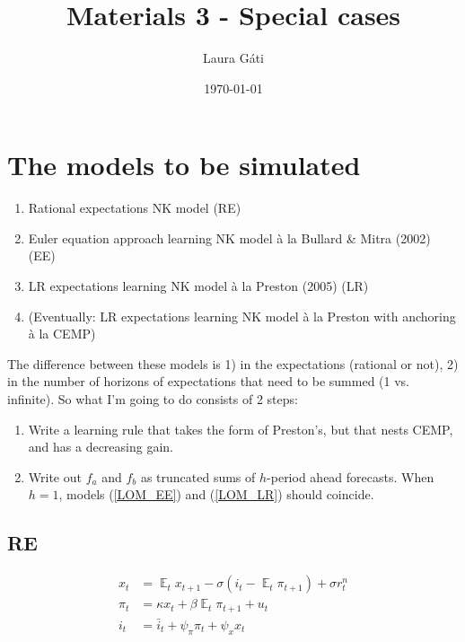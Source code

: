 \documentclass[11pt]{article}
\renewcommand{\[}{\begin{equation}}
\renewcommand{\]}{\end{equation}}
\DeclareMathOperator{\E}{\mathbb{E}}
\begin{document}
\linespread{1.0}

\title{Materials 3 - Special cases}
\author{Laura G\'ati} 
\date{\today}
\maketitle


\tableofcontents


\newpage
\section{The models to be simulated}
\begin{enumerate}
\item Rational expectations NK model (RE)
\item Euler equation approach learning NK model \`a la Bullard \& Mitra (2002)  (EE)
\item LR expectations learning NK model \`a la Preston (2005)  (LR)
\item (Eventually: LR expectations learning NK model \`a la Preston with anchoring \`a la CEMP)
\end{enumerate}

The difference between these models is 1) in the expectations (rational or not), 2) in the number of horizons of expectations that need to be summed (1 vs. infinite). So what I'm going to do consists of 2 steps: 
\begin{enumerate}
\item Write a learning rule that takes the form of Preston's, but that nests CEMP, and has a decreasing gain.
\item Write out $f_a$ and $f_b$ as truncated sums of $h$-period ahead forecasts. When $h=1$, models (\ref{LOM_EE}) and (\ref{LOM_LR}) should coincide.
\end{enumerate}

\subsection{RE}
\begin{align}
x_t &= \E_t x_{t+1} - \sigma(i_t - \E_t \pi_{t+1}) +\sigma r_t^n \label{NKIS} \\
\pi_t &= \kappa x_t +\beta \E_t \pi_{t+1} + u_t  \label{NKPC} \\
i_t &= \bar{i}_t + \psi_{\pi}\pi_t + \psi_{x} x_t  \label{TR}
\end{align}
\end{document}
